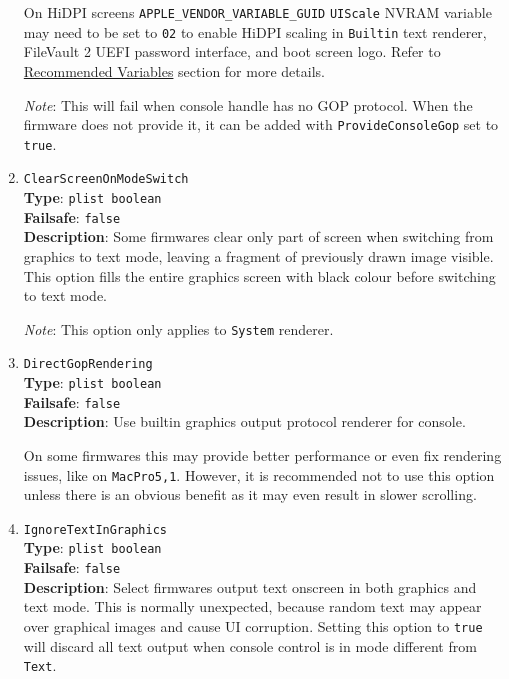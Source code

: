 \documentclass[]{article}
\begin{document}
\begin{enumerate}
  On HiDPI screens \texttt{APPLE\_VENDOR\_VARIABLE\_GUID} \texttt{UIScale}
  NVRAM variable may need to be set to \texttt{02} to enable HiDPI scaling
  in \texttt{Builtin} text renderer, FileVault 2 UEFI password interface,
  and boot screen logo. Refer to \hyperref[nvramvarsrec]{Recommended Variables}
  section for more details.

  \emph{Note}: This will fail when console handle has no GOP protocol. When
  the firmware does not provide it, it can be added with \texttt{ProvideConsoleGop}
  set to \texttt{true}.

\item
  \texttt{ClearScreenOnModeSwitch}\\
  \textbf{Type}: \texttt{plist\ boolean}\\
  \textbf{Failsafe}: \texttt{false}\\
  \textbf{Description}: Some firmwares clear only part of screen when switching
  from graphics to text mode, leaving a fragment of previously drawn image visible.
  This option fills the entire graphics screen with black colour before switching to
  text mode.

  \emph{Note}: This option only applies to \texttt{System} renderer.

\item
  \texttt{DirectGopRendering}\\
  \textbf{Type}: \texttt{plist\ boolean}\\
  \textbf{Failsafe}: \texttt{false}\\
  \textbf{Description}: Use builtin graphics output protocol renderer for console.

  On some firmwares this may provide better performance or even fix rendering issues,
  like on \texttt{MacPro5,1}. However, it is recommended not to use this option unless
  there is an obvious benefit as it may even result in slower scrolling.

\item
  \texttt{IgnoreTextInGraphics}\\
  \textbf{Type}: \texttt{plist\ boolean}\\
  \textbf{Failsafe}: \texttt{false}\\
  \textbf{Description}: Select firmwares output text onscreen in both graphics and
  text mode. This is normally unexpected, because random text may appear over
  graphical images and cause UI corruption. Setting this option to \texttt{true} will
  discard all text output when console control is in mode different from \texttt{Text}.


\end{enumerate}
\end{document}
